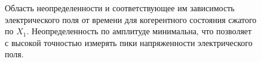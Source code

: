 \begin{figure}
\centering



\caption{Область неопределенности и соответствующее им зависимость
  электрического поля от времени для когерентного состояния сжатого по
  $X_1$. Неопределенность по амплитуде минимальна, что позволяет с
  высокой точностью измерять пики напряженности электрического поля.} 
\label{figPart3Squeezed_2}
\end{figure}

